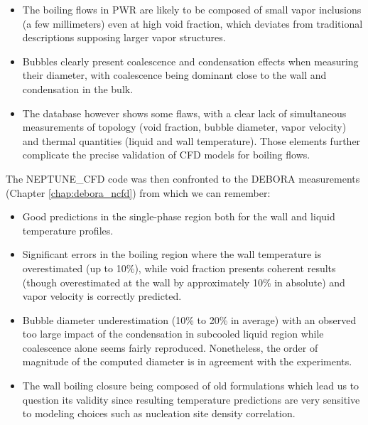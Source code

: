 \begin{itemize}
\item The boiling flows in PWR are likely to be composed of small vapor inclusions (a few millimeters) even at high void fraction, which deviates from traditional descriptions supposing larger vapor structures.
\item Bubbles clearly present coalescence and condensation effects when measuring their diameter, with coalescence being dominant close to the wall and condensation in the bulk.
\item The database however shows some flaws, with a clear lack of simultaneous measurements of topology (void fraction, bubble diameter, vapor velocity) and thermal quantities (liquid and wall temperature). Those elements further complicate the precise validation of CFD models for boiling flows. 
\end{itemize}

The NEPTUNE\_CFD code was then confronted to the DEBORA measurements (Chapter \ref{chap:debora_ncfd}) from which we can remember:

\begin{itemize}
\item Good predictions in the single-phase region both for the wall and liquid temperature profiles.
\item Significant errors in the boiling region where the wall temperature is overestimated (up to 10\%), while void fraction presents coherent results (though overestimated at the wall by approximately 10\% in absolute) and vapor velocity is correctly predicted.
\item Bubble diameter underestimation (10\% to 20\% in average) with an observed too large impact of the condensation in subcooled liquid region while coalescence alone seems fairly reproduced. Nonetheless, the order of magnitude of the computed diameter is in agreement with the experiments.
\item The wall boiling closure being composed of old formulations which lead us to question its validity since resulting temperature predictions are very sensitive to modeling choices such as nucleation site density correlation.
\end{itemize}

